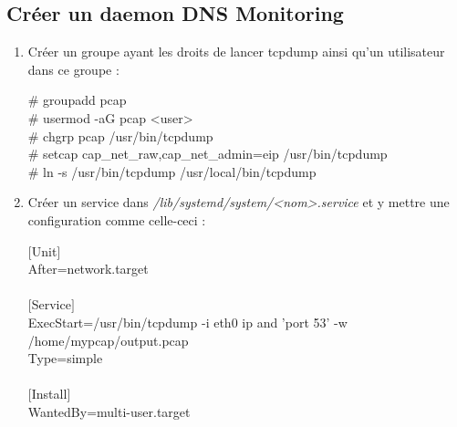 \documentclass[a4paper]{article}
\begin{document}
\subsection{Créer un daemon DNS Monitoring}
\begin{enumerate}
    \item Créer un groupe ayant les droits de lancer tcpdump ainsi qu'un utilisateur dans ce groupe :
    \begin{example}
    \# groupadd pcap\\[0.1cm]
    \# usermod -aG pcap <user> \\[0.1cm]
    \# chgrp pcap /usr/bin/tcpdump\\[0.1cm]
    \# setcap cap\_net\_raw,cap\_net\_admin=eip /usr/bin/tcpdump\\[0.1cm]
    \# ln -s /usr/bin/tcpdump /usr/local/bin/tcpdump
    \end{example}
    \item Créer un service dans \emph{/lib/systemd/system/<nom>.service} et y mettre une configuration comme celle-ceci :
    \begin{example}
    $[$Unit$]$\\After=network.target\\\\$[$Service$]$\\ExecStart=/usr/bin/tcpdump -i eth0 ip and 'port 53' -w /home/mypcap/output.pcap\\Type=simple\\\\$[$Install$]$\\WantedBy=multi-user.target
    \end{example}
\end{enumerate}
\end{document}
